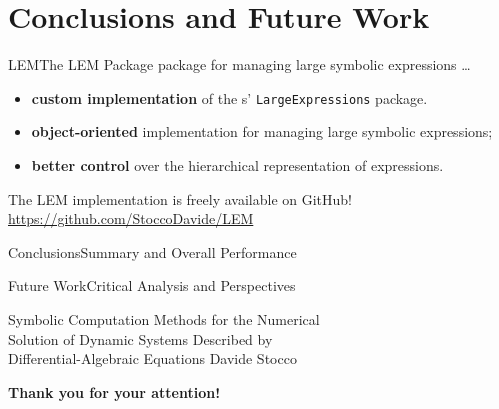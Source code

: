 
\section{Conclusions and Future Work}

\begin{frame}{\acl{LEM}}{The \ac{LEM} Package}
  \Maple{} package for managing large symbolic expressions \dots
  \begin{itemize}
    \item \textbf{custom implementation} of the \Maple{}s' \texttt{LargeExpressions} package.
    \item \textbf{object-oriented} implementation for managing large symbolic expressions;
    \item \textbf{better control} over the hierarchical representation of expressions.
  \end{itemize}
  \begin{bbox}
    The LEM implementation is freely available on GitHub! \\
    \centering \url{https://github.com/StoccoDavide/LEM}
  \end{bbox}
\end{frame}

\begin{frame}{Conclusions}{Summary and Overall Performance}

\end{frame}

\begin{frame}{Future Work}{Critical Analysis and Perspectives}
\end{frame}

\begin{frame}{%
  Symbolic Computation Methods for the Numerical \\
  Solution of Dynamic Systems Described by \\
  Differential-Algebraic Equations
  }{Davide Stocco}
  \vfill
  \raggedright{\selectfont\Huge\color{tx_sl_color}\bfseries{Thank you for your attention!}} \\[0.5em]
  \vfill
\end{frame}


